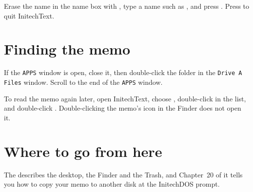 
\begin{TaskSteps}[resume]
\Step Erase the name in the name box with , type a name such
as , and press .
\Step Press  to quit InitechText.
\end{TaskSteps}

\section{Finding the memo}
\begin{TaskSteps}
\Step If the \texttt{APPS} window is open, close it, then double-click the
 folder in the \texttt{Drive A Files} window.
\Step Scroll to the end of the \texttt{APPS} window.
\end{TaskSteps}


To read the memo again later, open InitechText, choose ,
double-click  in the list, and double-click .
Double-clicking the memo's icon in the Finder does not open it.

\section{Where to go from here}
The  describes the desktop, the Finder and the
Trash, and Chapter~20 of it tells you how to copy your memo to another disk
at the InitechDOS prompt.
